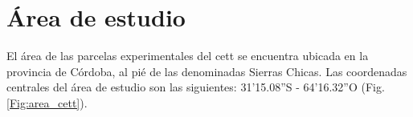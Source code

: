 \chapter{Área de estudio}
\label{chap:areadeestudio}




El área de las parcelas experimentales del \ac{cett} se encuentra ubicada en la provincia de Córdoba, al pié de las denominadas Sierras Chicas. Las coordenadas centrales del área de estudio son las siguientes: 31'15.08''S - 64'16.32''O (Fig. \ref{Fig:area_cett}). 

